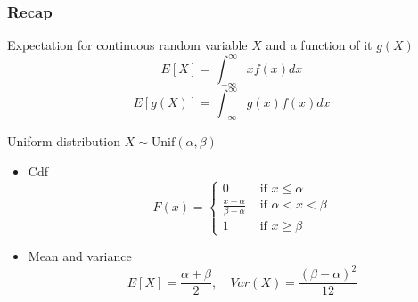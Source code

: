 \documentclass[slidestop,compress,mathserif]{beamer}
\begin{document}
\begin{frame}\frametitle{Recap}

Expectation for continuous random variable $X$ and a function of it $g(X)$
\[E[X] = \int_{-\infty}^{\infty} x f(x) dx\]
\[E[g(X)] = \int_{-\infty}^{\infty} g(x) f(x) dx\]

\pause

Uniform distribution $X \sim \text{Unif}(\alpha, \beta)$
{
\begin{itemize}
\item Cdf \vspace{-0.6cm}
\[ F(x) =
\begin{cases}
0 & \text{ if } x \leq \alpha\\
\frac{x-\alpha}{\beta-\alpha} & \text{ if } \alpha < x < \beta\\
1 & \text{ if } x \geq \beta
\end{cases}
 \]
\end{itemize}
}
\begin{itemize}
\item Mean and variance  \vspace{-0.2cm}
\[ E[X]   = \frac{\alpha + \beta}{2}, \quad Var(X)   = \frac{(\beta - \alpha)^2}{12} \]
\end{itemize}



\end{frame}
\end{document}
